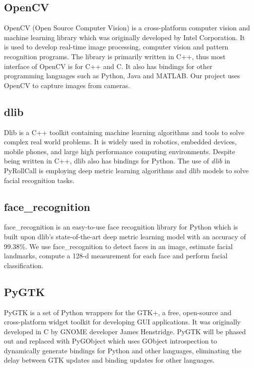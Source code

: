 
\subsection{OpenCV}  %
OpenCV (Open Source Computer Vision) \cite{opencv} is a cross-platform computer vision and machine learning library which was
originally developed by Intel Corporation. It is used to develop real-time image processing, computer vision
and pattern recognition programs. The library is primarily written in C++, thus most interface of
OpenCV is for C++ and C. It also has bindings for other programming languages such as Python, Java and MATLAB.
Our project uses OpenCV to capture images from cameras.

\subsection{dlib}  %
Dlib \cite{dlib} is a C++ toolkit containing machine learning algorithms and tools to solve complex real world problems.
It is widely used in robotics, embedded devices, mobile phones, and large high performance
computing environments. Despite being written in C++, dlib also has bindings for Python. The use of \emph{dlib}
in PyRollCall is employing deep metric learning algorithms and dlib models to solve facial recognition tasks.

\subsection{face\_recognition}  %
face\_recognition \cite{face-recognition} is an easy-to-use face recognition library for Python which is built upon
dlib's state-of-the-art deep metric learning model with an accuracy of 99.38\%. We use face\_recognition to detect faces
in an image, estimate facial landmarks, compute a 128-d measurement for each face and perform facial classification.

\subsection{PyGTK}  %
PyGTK \cite{pygtk} is a set of Python wrappers for the GTK+, a free, open-source and cross-platform widget toolkit for
developing GUI applications. It was originally developed in C by GNOME developer James Henstridge.
PyGTK will be phased out and replaced with PyGObject which uses GObject introspection to dynamically generate
bindings for Python and other languages, eliminating the delay between GTK updates and binding updates for
other languages.

